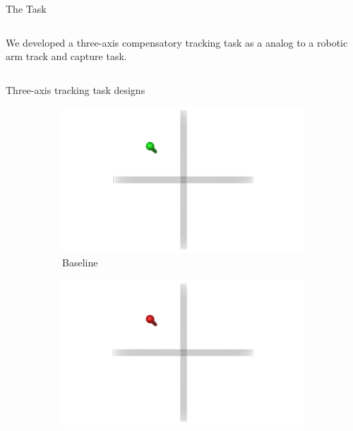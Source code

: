 \documentclass[10pt]{beamer}
\begin{document}
\begin{frame}[fragile]{The Task}
  \begin{columns}[T]
    \begin{column}{.8\textwidth}
      We developed a three-axis compensatory tracking task as a analog to a robotic arm track and capture task.
    \end{column}
  \end{columns}
\end{frame}

\begin{frame}[fragile]{Three-axis tracking task designs}
  \begin{figure}
    \begin{center}
      \begin{subfigure}{0.45\linewidth}
        \includegraphics[width=\linewidth]{../img/Baseline.png}
        \caption{Baseline}
      \end{subfigure}\hfill
      \begin{subfigure}{0.45\linewidth}
        \includegraphics[width=\linewidth]{../img/Color.png}

\end{subfigure}
\end{center}
\end{figure}
\end{frame}
\end{document}
